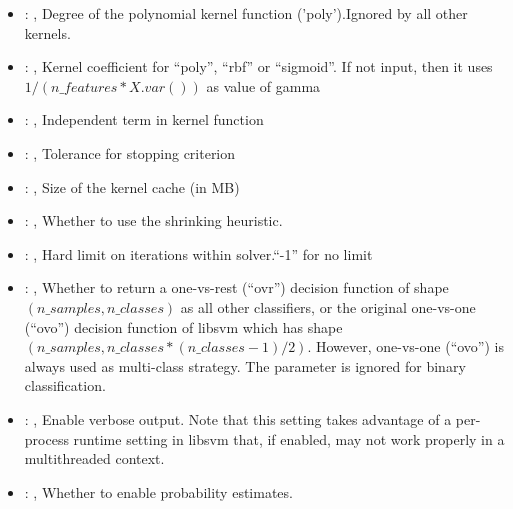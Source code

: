 \begin{itemize}
    \item {}: , 
      Degree of the polynomial kernel function ('poly').Ignored by all other kernels.

    \item {}: , 
      Kernel coefficient for ``poly'', ``rbf'' or ``sigmoid''. If not input, then it uses
      $1 / (n\_features * X.var())$ as value of gamma

    \item {}: , 
      Independent term in kernel function

    \item {}: , 
      Tolerance for stopping criterion

    \item {}: , 
      Size of the kernel cache (in MB)

    \item {}: , 
      Whether to use the shrinking heuristic.

    \item {}: , 
      Hard limit on iterations within solver.``-1'' for no limit

    \item {}: , 
      Whether to return a one-vs-rest (``ovr'') decision function of shape $(n\_samples, n\_classes)$
      as                                                            all other classifiers, or the
      original one-vs-one (``ovo'') decision function of libsvm which has
      shape $(n\_samples, n\_classes * (n\_classes - 1) / 2)$. However, one-vs-one (``ovo'') is always
      used as                                                            multi-class strategy. The
      parameter is ignored for binary classification.

    \item {}: , 
      Enable verbose output. Note that this setting takes advantage
      of a per-process runtime setting in libsvm that, if enabled, may not
      work properly in a multithreaded context.

    \item {}: , 
      Whether to enable probability estimates.


\end{itemize}
